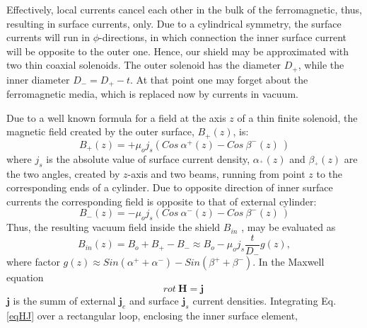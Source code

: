\documentclass[12pt]{article}
\begin{document}
   Effectively, local currents cancel each other in the bulk
of the ferromagnetic, thus,  resulting in surface currents, only. 
Due to a cylindrical symmetry,
  the surface  currents will run in $\phi$-directions, 
in which connection
the inner surface current 
will be opposite to the outer one.
      Hence, our shield  may be approximated with  
two  thin coaxial solenoids.
The outer solenoid has the diameter $D_+$, while the inner diameter 
$D_-=D_+-t$. At that point one may forget about the ferromagnetic 
media, which is replaced now by currents in vacuum.

Due to a well known formula for a 
field at the axis $z$  of a thin  finite  solenoid,
the magnetic field created by the outer surface, $B_+(z)$,   is:
\begin{equation}
B_{+}(z)=+\mu_o j_s(Cos~\alpha^+(z)-Cos~\beta^-(z)~)
\label{eq31}
\end{equation}
where $j_s$ is the absolute value of surface current density,
 $\alpha_^+(z)$ and $\beta_^+(z)$
are  the two  angles,  created by $z$-axis and two  beams,
 running from   point $z$ to the corresponding ends  of  a  cylinder.
Due to  opposite direction of  inner surface 
currents the corresponding field is opposite to that of external cylinder:
\begin{equation}
B_-(z)=-\mu_o j_s(Cos~\alpha^-(z) - Cos~\beta^-(z)~)
\label{eq32}
\end{equation}
Thus, the resulting vacuum field inside 
the   shield $B_{in}$ , may  be evaluated as
\begin{equation}
B_{in}(z)=B_o + B_+ - B_-\approx B_o- \mu_o j_s \frac{t}{D_-}g(z),
\label{eq1}
\end{equation}
where  factor 
$g(z)\approx Sin(\alpha^+ + \alpha^-)-Sin(\beta^+ + \beta^-)$.
%
In  the Maxwell equation
\begin{equation}
rot~\textbf{H} = \textbf{j} ~
\label{eqHJ}
\end{equation}
$\textbf{j}$ %
is the summ of external $\textbf{j}_e$  and
 surface  $\textbf{j}_s$ current densities.
Integrating Eq.\ref{eqHJ} 
over a rectangular loop, 
enclosing the inner surface element, 
\end{document}
